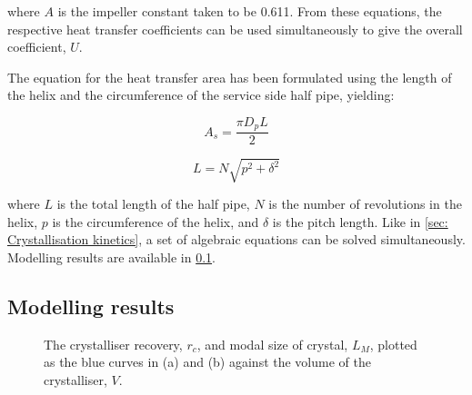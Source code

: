 \noindent where $A$ is the impeller constant taken to be 0.611. From these equations, the respective heat transfer coefficients can be used simultaneously to give the overall coefficient, $U$.

The equation for the heat transfer area has been formulated using the length of the helix and the circumference of the service side half pipe, yielding:

\begin{equation} \label{eq:coolantpipesa}
    A_s = \frac{\pi D_p L}{2}
    \end{equation}
    
\begin{equation}\label{eq:helixlength}
    L = N \sqrt{p^2 + \delta^2}
\end{equation}

\noindent where $L$ is the total length of the half pipe, $N$ is the number of revolutions in the helix, $p$ is the circumference of the helix, and $\delta$ is the pitch length. Like in \cref{sec: Crystallisation kinetics}, a set of algebraic equations can be solved simultaneously. Modelling results are available in \cref{sec:modelling results crystalliser}.

\subsection{Modelling results}\label{sec:modelling results crystalliser}

\begin{figure}[h]
    \centering
    
    \caption{The crystalliser recovery, $r_c$, and modal size of crystal, $L_M$, plotted as the blue curves in (a) and (b) against the volume of the crystalliser, $V$.}
    \label{fig:recovery vs volume crystalliser}
\end{figure}

